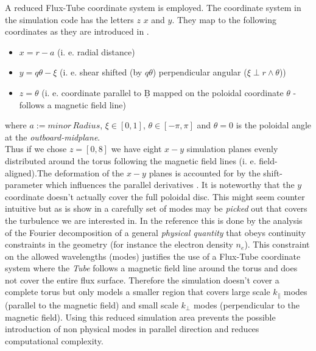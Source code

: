\documentclass[master.tex]{subfiles}
\begin{document}
A reduced Flux-Tube coordinate system is employed.
The coordinate system in the simulation code has the letters $z$ $x$ and $y$. They map to the following coordinates as they are introduced in \cite{doi:10.1063/1.1335832}.
\begin{itemize}
    \item $x = r - a$   (i. e. radial distance)
    \item $y = q\theta - \xi$ (i. e. shear shifted (by $q\theta$) perpendicular angular ($\xi \perp r \land \theta$))
    \item $z = \theta$ (i. e. coordinate parallel to $\underline{\mathrm{B}}$ mapped on the poloidal coordinate $\theta$ - follows a magnetic field line)
\end{itemize} 
where $a:=minor\, Radius$, $\xi \in [0,1]$, $\theta \in [-\pi,\pi]$ and $\theta = 0$ is the poloidal angle at the \textit{outboard-midplane}.\\
Thus if we chose $z=[0,8]$ we have eight $x-y$ simulation planes evenly distributed around the torus following the magnetic field lines (i. e. field-aligned).The deformation of the $x-y$ planes is accounted for by the shift-parameter which influences the parallel derivatives \cite{ScootShiftedMetric}.\newline
It is noteworthy that the $y$ coordinate doesn't actually cover the full poloidal disc. This might seem counter intuitive but as is show in \cite{ScottFluxTube} a carefully set of modes may be \textit{picked} out that covers the turbulence we are interested in. In the reference this is done by the analysis of the Fourier decomposition of a general \textit{physical quantity} that obeys continuity constraints in the geometry (for instance the electron density $n_e$).
This constraint on the allowed wavelengths (modes) justifies the use of a Flux-Tube coordinate system where the \textit{Tube} follows a magnetic field line around the torus and does not cover the entire flux surface. Therefore the simulation doesn't cover a complete torus but only models a smaller region that covers large scale $k_\parallel$ modes (parallel to the magnetic field) and small scale $k_\perp$ modes (perpendicular to the magnetic field). Using this reduced simulation area prevents the possible introduction of non physical modes in parallel direction and reduces computational complexity.
\end{document}
